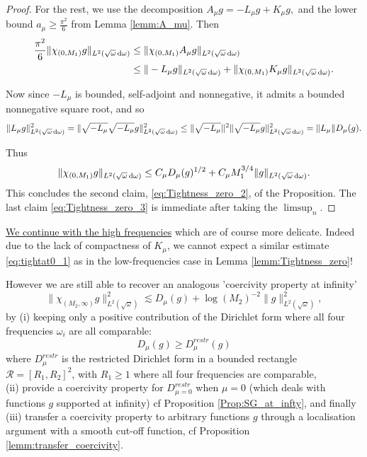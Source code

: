 \documentclass[reqno,11pt,letterpaper]{amsart}
\numberwithin{equation}{section}
\newcommand{\dd}{\, {\rm d}}
\begin{document}
\begin{proof}
For the rest, we use the decomposition $ A_\mu g=-L_\mu g+K_\mu g,
$ and the lower bound $a_\mu\ge \frac{\pi^2}{6}$ from Lemma \ref{lemm:A_mu}. Then  
\begin{equation}
\begin{split}
    \frac{\pi^2}{6}\|\chi_{(0,M_1)}g\|_{L^2(\sqrt{\omega}\dd\omega)}
    &\le \|\chi_{(0,M_1)}A_\mu g\|_{L^2(\sqrt{\omega}\dd\omega)} \\
    &\le
    \|-L_\mu g\|_{L^2(\sqrt{\omega}\dd\omega)}
    +\|\chi_{(0,M_1)}K_\mu g\|_{L^2(\sqrt{\omega}\dd\omega)}.
\end{split}
\end{equation}

Now since $-L_\mu$ is bounded, self-adjoint and nonnegative, it admits a bounded nonnegative square root, and so
$$ \|L_\mu g\|_{L^2(\sqrt{\omega}\dd\omega)}^2 =\|\sqrt{-L_\mu} \sqrt{-L_\mu}g\|_{L^2(\sqrt{\omega}\dd\omega)}^2 \le \|\sqrt{-L_\mu}\|^2\|\sqrt{-L_\mu}g\|_{L^2(\sqrt{\omega}\dd\omega)}^2 = \|L_\mu\| D_\mu(g).
$$

Thus
    $$
\|\chi_{(0,M_1)}g\|_{L^2(\sqrt{\omega}\dd\omega)}
\le C_\mu D_\mu(g)^{1/2}
    + C_\mu M_1^{3/4}\|g\|_{L^2(\sqrt{\omega}\dd\omega)}.
$$
This concludes the second claim, \eqref{eq:Tightness_zero_2}, of the Proposition. 
The last claim \eqref{eq:Tightness_zero_3} is immediate after taking the $\limsup_n$. 
\end{proof}

\underline{We continue with the high frequencies} which are of course  more delicate. Indeed due to the lack of compactness of $K_\mu$, we cannot expect a similar estimate \eqref{eq:tightat0_1} as in the low-frequencies case in Lemma \ref{lemm:Tightness_zero}!

However we are still able to recover an analogous 'coercivity property at infinity' 
$$ \|\chi_{(M_2, \infty)}g\|_{L^2(\sqrt{\omega})}^2 \lesssim D_\mu (g) + \log(M_2)^{-2} \|g\|_{L^2(\sqrt{\omega})}^2, $$
by (i) keeping only a positive contribution of the Dirichlet form where all four frequencies $\omega_i$ are all comparable: $$D_\mu(g)\geq D_\mu^{restr}(g)$$
where $D_\mu^{restr}$ is the restricted Dirichlet form in a bounded rectangle $\mathcal{R} = [R_1,R_2]^2$, with $R_1\geq 1$ where all four frequencies are comparable,\\ (ii) provide a coercivity property for $D_{\mu=0}^{restr}$ when $\mu=0$ (which deals with functions $g$ supported at infinity) cf Proposition \ref{Prop:SG_at_infty},  and finally \\ (iii) transfer a coercivity property to arbitrary functions $g$ through a localisation argument with a smooth cut-off function, cf Proposition \ref{lemm:transfer_coercivity}.
\end{document}
